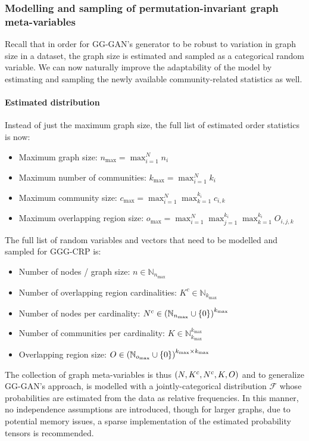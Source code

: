 \subsubsection{Modelling and sampling of permutation-invariant graph meta-variables}
Recall that in order for GG-GAN's generator to be robust to variation in graph size in a dataset, the graph size is estimated and sampled as a categorical random variable. We can now naturally improve the adaptability of the model by estimating and sampling the newly available community-related statistics as well.

\paragraph{Estimated distribution}
Instead of just the maximum graph size, the full list of estimated order statistics is now:
\begin{itemize}
\item Maximum graph size: $n_{\max}=\max_{i=1}^{N}{n_i}$
\item Maximum number of communities: $k_{\max}=\max_{i=1}^{N}{k_i}$
\item Maximum community size: $c_{\max}=\max_{i=1}^{N}\max_{k=1}^{k_i}{c_{i,k}}$
\item Maximum overlapping region size: $o_{\max}=\max_{i=1}^{N}\max_{j=1}^{k_i}\max_{k=1}^{k_i}{O_{i,j,k}}$
\end{itemize}

The full list of random variables and vectors that need to be modelled and sampled for GGG-CRP is:

\begin{itemize}
\item Number of nodes / graph size: $n \in \mathbb{N}_{n_{\max}}$
\item Number of overlapping region cardinalities: $K^c \in \mathbb{N}_{k_{\max}}$
\item Number of nodes per cardinality: $N^c \in \mathopen{}\left(\mathbb{N}_{n_{\max}} \cup \mathopen{}\left\{0\right\}\right)^{k_{\max}}$
\item Number of communities per cardinality: $K \in \mathbb{N}_{k_{\max}}^{k_{\max}}$
\item Overlapping region size: $O \in \mathopen{}\left(\mathbb{N}_{o_{\max}} \cup \mathopen{}\left\{0\right\}\right)^{k_{\max} \times k_{\max}}$
\end{itemize}

The collection of graph meta-variables is thus $\mathopen{}\left(N, K^c, N^c, K, O\right)$ and to generalize GG-GAN's approach, is modelled with a jointly-categorical distribution $\mathcal{F}$ whose probabilities are estimated from the data as relative frequencies. In this manner, no independence assumptions are introduced, though for larger graphs, due to potential memory issues, a sparse implementation of the estimated probability tensors is recommended.

